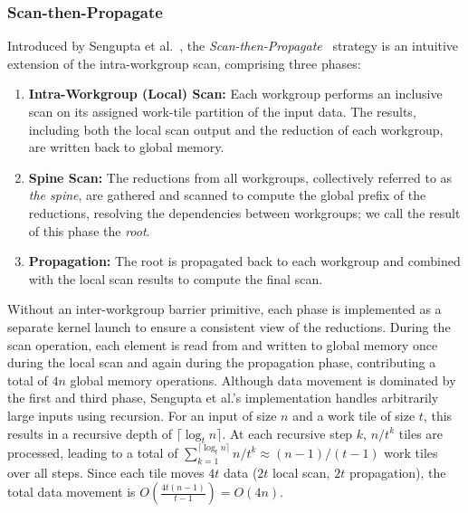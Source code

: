 \documentclass[sigconf]{acmart}
\begin{document}
\subsubsection{Scan-then-Propagate}
Introduced by Sengupta et al.~\cite{10.5555/1280094.1280110}, the \emph{Scan-then-Propagate}~\cite{GPUGems3, Sengupta2008} strategy is an intuitive extension of the intra-workgroup scan, comprising three phases:
\begin{enumerate}
  \item \textbf{Intra-Workgroup (Local) Scan:} Each workgroup performs an inclusive scan on its assigned work-tile partition of the input data. The results, including both the local scan output and the reduction of each workgroup, are written back to global memory.
  \item \textbf{Spine Scan:} The reductions from all workgroups, collectively referred to as \emph{the spine}, are gathered and scanned to compute the global prefix of the reductions, resolving the dependencies between workgroups; we call the result of this phase the \emph{root}.
  \item \textbf{Propagation:} The root is propagated back to each workgroup and combined with the local scan results to compute the final scan.
\end{enumerate}
Without an inter-workgroup barrier primitive, each phase is implemented as a separate kernel launch to ensure a consistent view of the reductions. During the scan operation, each element is read from and written to global memory once during the local scan and again during the propagation phase, contributing a total of $4n$ global memory operations. Although data movement is dominated by the first and third phase, Sengupta et al.'s implementation handles arbitrarily large inputs using recursion. For an input of size $n$ and a work tile of size $t$, this results in a recursive depth of $\lceil \log_t n \rceil$. At each recursive step $k$, $n/t^k$ tiles are processed, leading to a total of $\sum_{k=1}^{\lceil \log_t n \rceil} n/t^k \approx (n - 1)/(t - 1)$ work tiles over all steps. Since each tile moves $4t$ data ($2t$ local scan, $2t$ propagation), the total data movement is $O\left(\frac{4t(n - 1)}{t - 1}\right) = O(4n)$.
\end{document}
